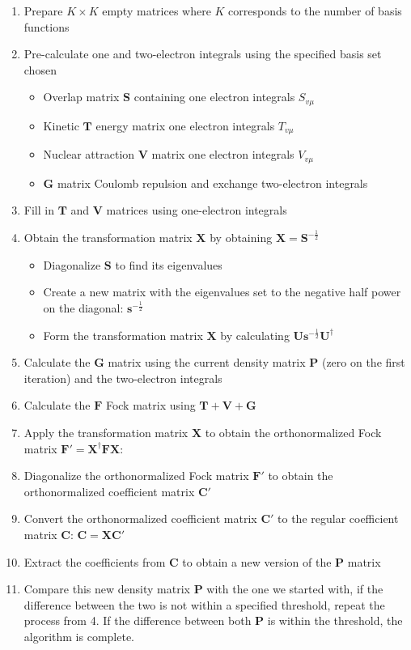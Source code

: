 \documentclass[10pt, oneside, letterpaper]{article}
\begin{document}
\begin{enumerate}
    \item Prepare $K \times K$ empty matrices where $K$ corresponds to the number of basis functions
    \item Pre-calculate one and two-electron integrals using the specified basis set chosen
      \begin{itemize}
        \item Overlap matrix $\bm{S}$ containing one electron integrals $S_{v\mu}$
        \item Kinetic $\bm{T}$ energy matrix one electron integrals $T_{v\mu}$
        \item Nuclear attraction $\bm{V}$ matrix one electron integrals $V_{v\mu}$
        \item $\bm{G}$ matrix Coulomb repulsion and exchange two-electron integrals
      \end{itemize}
    \item Fill in $\bm{T}$ and $\bm{V}$ matrices using one-electron integrals
    \item Obtain the transformation matrix $\bm{X}$ by obtaining $\bm{X} = \bm{S}^{-\frac{1}{2}}$
      \begin{itemize}
        \item Diagonalize $\bm{S}$ to find its eigenvalues
        \item Create a new matrix with the eigenvalues set to the negative half power on the diagonal: $\bm{s}^{-\frac{1}{2}}$
        \item Form the transformation matrix $\bm{X}$ by calculating $\bm{U}\bm{s}^{-\frac{1}{2}}\bm{U}^\dagger$
      \end{itemize}
    \item Calculate the $\bm{G}$ matrix using the current density matrix $\bm{P}$ (zero on the first iteration) and the two-electron integrals
    \item Calculate the $\bm{F}$ Fock matrix using $\bm{T} + \bm{V} + \bm{G}$
    \item Apply the transformation matrix $\bm{X}$ to obtain the orthonormalized Fock matrix $\bm{F}' = \bm{X}^\dagger\bm{F}\bm{X}$:
    \item Diagonalize the orthonormalized Fock matrix $\bm{F}'$ to obtain the orthonormalized coefficient matrix $\bm{C}'$
    \item Convert the orthonormalized coefficient matrix $\bm{C}'$ to the regular coefficient matrix $\bm{C}$: $\bm{C} = \bm{X}\bm{C}'$
    \item Extract the coefficients from $\bm{C}$ to obtain a new version of the $\bm{P}$ matrix
    \item Compare this new density matrix $\bm{P}$ with the one we started with, if the difference between the two is not within a specified threshold, repeat the process from 4. If the difference between both $\bm{P}$ is within the threshold, the algorithm is complete.

\end{enumerate}
\end{document}
